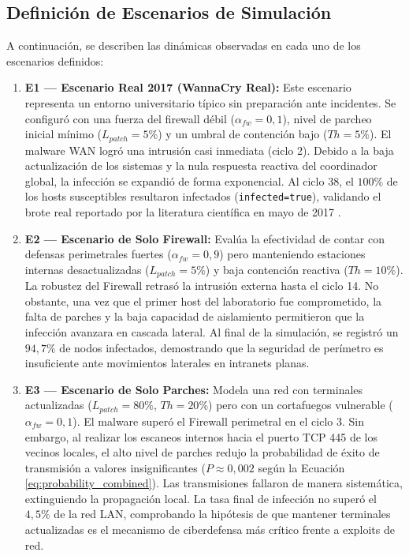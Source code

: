 \subsection{Definición de Escenarios de Simulación}
A continuación, se describen las dinámicas observadas en cada uno de los escenarios definidos:

\begin{enumerate}
    \item \textbf{E1 — Escenario Real 2017 (WannaCry Real):} Este escenario representa un entorno universitario típico sin preparación ante incidentes. Se configuró con una fuerza del firewall débil ($\alpha_{fw} = 0,1$), nivel de parcheo inicial mínimo ($L_{patch} = 5\%$) y un umbral de contención bajo ($Th = 5\%$). El malware WAN logró una intrusión casi inmediata (ciclo 2). Debido a la baja actualización de los sistemas y la nula respuesta reactiva del coordinador global, la infección se expandió de forma exponencial. Al ciclo 38, el $100\%$ de los hosts susceptibles resultaron infectados (\texttt{infected}\allowbreak\texttt{=}\allowbreak\texttt{true}), validando el brote real reportado por la literatura científica en mayo de 2017 \cite{enisa2017wannacry}.
    \item \textbf{E2 — Escenario de Solo Firewall:} Evalúa la efectividad de contar con defensas perimetrales fuertes ($\alpha_{fw} = 0,9$) pero manteniendo estaciones internas desactualizadas ($L_{patch} = 5\%$) y baja contención reactiva ($Th = 10\%$). La robustez del Firewall retrasó la intrusión externa hasta el ciclo 14. No obstante, una vez que el primer host del laboratorio fue comprometido, la falta de parches y la baja capacidad de aislamiento permitieron que la infección avanzara en cascada lateral. Al final de la simulación, se registró un $94,7\%$ de nodos infectados, demostrando que la seguridad de perímetro es insuficiente ante movimientos laterales en intranets planas.
    \item \textbf{E3 — Escenario de Solo Parches:} Modela una red con terminales actualizadas ($L_{patch} = 80\%$, $Th = 20\%$) pero con un cortafuegos vulnerable ($\alpha_{fw} = 0,1$). El malware superó el Firewall perimetral en el ciclo 3. Sin embargo, al realizar los escaneos internos hacia el puerto TCP 445 de los vecinos locales, el alto nivel de parches redujo la probabilidad de éxito de transmisión a valores insignificantes ($P \approx 0,002$ según la Ecuación \ref{eq:probability_combined}). Las transmisiones fallaron de manera sistemática, extinguiendo la propagación local. La tasa final de infección no superó el $4,5\%$ de la red LAN, comprobando la hipótesis de que mantener terminales actualizadas es el mecanismo de ciberdefensa más crítico frente a exploits de red.

\end{enumerate}
